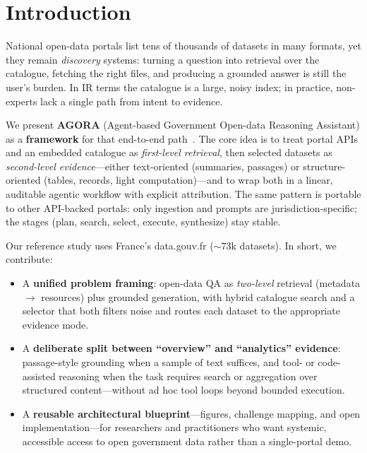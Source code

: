 \documentclass[sigconf,anonymous]{acmart}
\begin{document}
\section{Introduction}
\label{sec:intro}

National open-data portals list tens of thousands of datasets in many formats, yet they remain \emph{discovery} systems: turning a question into retrieval over the catalogue, fetching the right files, and producing a grounded answer is still the user's burden. In IR terms the catalogue is a large, noisy index; in practice, non-experts lack a single path from intent to evidence.

We present \textbf{AGORA} (Agent-based Government Open-data Reasoning Assistant) as a \textbf{framework} for that end-to-end path~\cite{li2024multiagent, yu2025agent}. The core idea is to treat portal APIs and an embedded catalogue as \emph{first-level retrieval}, then selected datasets as \emph{second-level evidence}---either text-oriented (summaries, passages) or structure-oriented (tables, records, light computation)---and to wrap both in a linear, auditable agentic workflow with explicit attribution. The same pattern is portable to other API-backed portals: only ingestion and prompts are jurisdiction-specific; the stages (plan, search, select, execute, synthesize) stay stable.

Our reference study uses France's data.gouv.fr ($\sim$73k datasets). In short, we contribute:
\begin{itemize}
  \item A \textbf{unified problem framing}: open-data QA as \emph{two-level} retrieval (metadata $\rightarrow$ resources) plus grounded generation, with hybrid catalogue search and a selector that both filters noise and routes each dataset to the appropriate evidence mode.
  \item A \textbf{deliberate split between ``overview'' and ``analytics'' evidence}: passage-style grounding when a sample of text suffices, and tool- or code-assisted reasoning when the task requires search or aggregation over structured content---without ad hoc tool loops beyond bounded execution.
  \item A \textbf{reusable architectural blueprint}---figures, challenge mapping, and open implementation---for researchers and practitioners who want systemic, accessible access to open government data rather than a single-portal demo.
\end{itemize}
\end{document}
